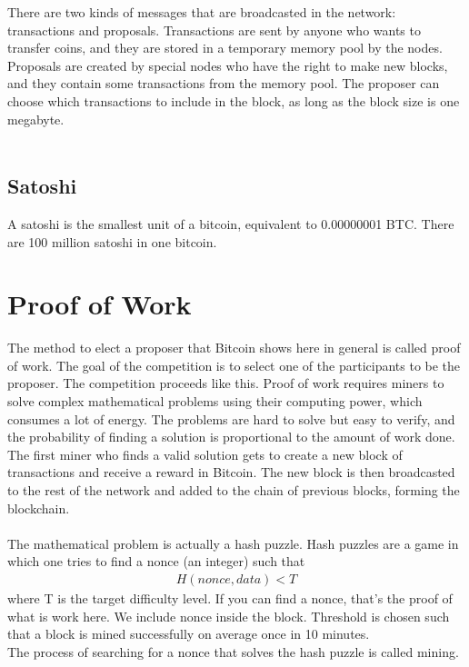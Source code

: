 \documentclass{report}
\begin{document}
There are two kinds of messages that are broadcasted in the network: transactions and proposals. Transactions are sent by anyone who wants to transfer coins, and they are stored in a temporary memory pool by the nodes. Proposals are created by special nodes who have the right to make new blocks, and they contain some transactions from the memory pool. The proposer can choose which transactions to include in the block, as long as the block size is one megabyte.\\\\
\subsection{Satoshi}
A satoshi is the smallest unit of a bitcoin, equivalent to 0.00000001 BTC. There are 100 million satoshi in one bitcoin.
\section{Proof of Work}
The method to elect a proposer that Bitcoin shows here in general is called proof of work. The goal of the competition is to select one of the participants to be the proposer.  The competition proceeds like this.  Proof of work requires miners to solve complex mathematical problems using their computing power, which consumes a lot of energy. The problems are hard to solve but easy to verify, and the probability of finding a solution is proportional to the amount of work done. The first miner who finds a valid solution gets to create a new block of transactions and receive a reward in Bitcoin. The new block is then broadcasted to the rest of the network and added to the chain of previous blocks, forming the blockchain.\\\\
The mathematical problem is actually a hash puzzle. Hash puzzles are a game in which one tries to find a nonce (an integer) such that 
\begin{align*}
	H(nonce, data) < T
\end{align*}
where T is the target difficulty level. If you can find a nonce, that's the proof of what is work here. We include nonce inside the block. Threshold is chosen such that a block is mined successfully on average once in 10 minutes.\\
The process of searching for a nonce that solves the hash puzzle is called mining.
\end{document}
